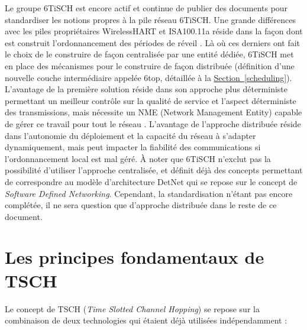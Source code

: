 \documentclass[]{report}
\newcommand{\wordlink}[2]{\hyperref[#2]{#1~\ref{#2}}}
\begin{document}
Le groupe 6TiSCH est encore actif et continue de publier des documents pour standardiser les notions propres à la pile réseau 6TiSCH. Une grande différences avec les piles propriétaires WirelessHART et ISA100.11a réside dans la façon dont est construit l'ordonnancement des périodes de réveil \cite{SODA}. Là où ces derniers ont fait le choix de le construire de façon centralisée par une entité dédiée, 6TiSCH met en place des mécanismes pour le construire de façon distribuée (définition d'une nouvelle couche intermédiaire appelée 6top, détaillée à la \wordlink{Section}{scheduling}). L'avantage de la première solution réside dans son approche plus déterministe permettant un meilleur contrôle sur la qualité de service et l'aspect déterministe des transmissions, mais nécessite un NME (Network Management Entity) capable de gérer ce travail pour tout le réseau \cite{ietf-6tisch-architecture-28}. L'avantage de l'approche distribuée réside dans l'autonomie du déploiement et la capacité du réseau à s'adapter dynamiquement, mais peut impacter la fiabilité des communications si l'ordonnancement local est mal géré. À noter que 6TiSCH n'exclut pas la possibilité d'utiliser l'approche centralisée, et définit déjà des concepts permettant de correspondre au modèle d'architecture DetNet \cite{ietf-6tisch-architecture-28} qui se repose sur le concept de \textit{Software Defined Networking}. Cependant, la standardisation n'étant pas encore complétée, il ne sera question que d'approche distribuée dans le reste de ce document.

\newpage

\section{Les principes fondamentaux de TSCH}
\label{tschfond}

Le concept de TSCH (\textit{Time Slotted Channel Hopping}) se repose sur la combinaison de deux technologies qui étaient déjà utilisées indépendamment :\\
\end{document}
